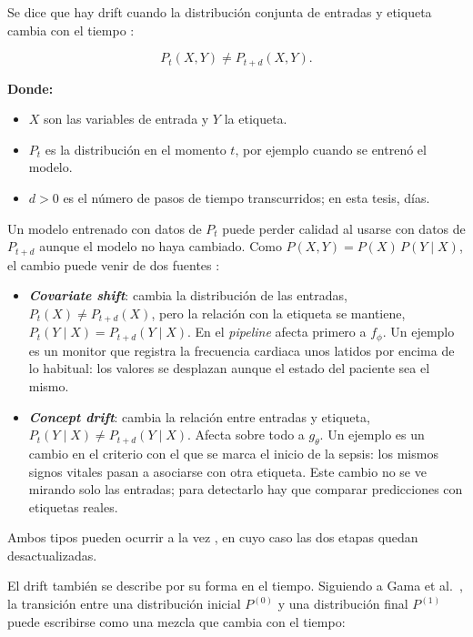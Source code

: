 Se dice que hay drift cuando la distribución conjunta de entradas y etiqueta cambia con el
tiempo \cite{gama2014survey,morenotorres2012shift}:

\begin{equation}
    P_t(X,Y) \neq P_{t+d}(X,Y).
    \label{eq:distribution_shift}
\end{equation}

\noindent\textbf{Donde:}
\begin{itemize}
    \item $X$ son las variables de entrada y $Y$ la etiqueta.
    \item $P_t$ es la distribución en el momento $t$, por ejemplo cuando se entrenó el modelo.
    \item $d > 0$ es el número de pasos de tiempo transcurridos; en esta tesis, días.
\end{itemize}

Un modelo entrenado con datos de $P_t$ puede perder calidad al usarse con datos de
$P_{t+d}$ aunque el modelo no haya cambiado. Como $P(X,Y) = P(X)\,P(Y \mid X)$, el cambio
puede venir de dos fuentes \cite{morenotorres2012shift}:

\begin{itemize}
    \item \textbf{\textit{Covariate shift}}: cambia la distribución de las entradas,
    $P_t(X) \neq P_{t+d}(X)$, pero la relación con la etiqueta se mantiene,
    $P_t(Y \mid X) = P_{t+d}(Y \mid X)$. En el \textit{pipeline} afecta primero a $f_\phi$.
    Un ejemplo es un monitor que registra la frecuencia cardiaca unos latidos por encima de
    lo habitual: los valores se desplazan aunque el estado del paciente sea el mismo.
    \item \textbf{\textit{Concept drift}}: cambia la relación entre entradas y etiqueta,
    $P_t(Y \mid X) \neq P_{t+d}(Y \mid X)$. Afecta sobre todo a $g_\theta$. Un ejemplo es un
    cambio en el criterio con el que se marca el inicio de la sepsis: los mismos signos
    vitales pasan a asociarse con otra etiqueta. Este cambio no se ve mirando solo las
    entradas; para detectarlo hay que comparar predicciones con etiquetas reales.
\end{itemize}

Ambos tipos pueden ocurrir a la vez \cite{gama2014survey}, en cuyo caso las dos etapas
quedan desactualizadas.

El drift también se describe por su forma en el tiempo. Siguiendo a Gama et
al.~\cite{gama2014survey}, la transición entre una distribución inicial $P^{(0)}$ y una
distribución final $P^{(1)}$ puede escribirse como una mezcla que cambia con el tiempo:

